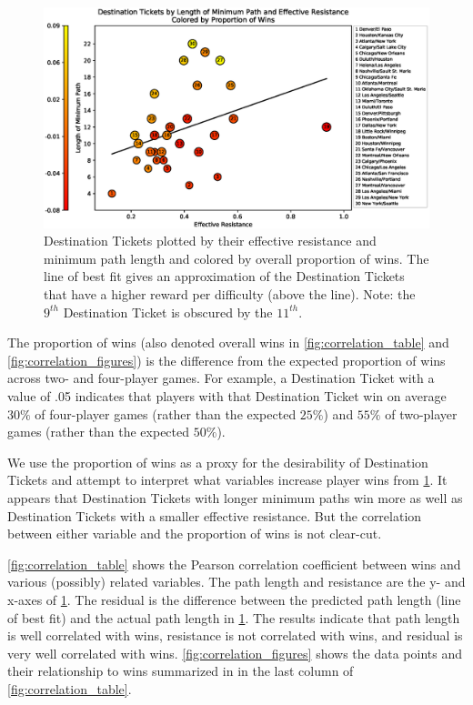 \begin{figure}[h]
    \centering
    \includegraphics[scale=.6]{figures/resistance_aggregate}
    \caption{Destination Tickets plotted by their effective
    resistance and minimum path length and colored
    by overall proportion of wins.
    The line of best fit gives an approximation of the
    Destination Tickets that have a higher reward per difficulty
    (above the line).
    Note: the $9^{th}$ Destination Ticket 
    is obscured by the $11^{th}$.}
    \label{fig:resistance}
\end{figure}

The proportion of wins (also denoted overall wins
in \cref{fig:correlation_table} and \cref{fig:correlation_figures})
is the difference from the expected proportion of wins
across two- and four-player games.
For example, a Destination Ticket with a value of .05 indicates
that players with that Destination Ticket 
win on average $30\%$ of four-player games
(rather than the expected $25\%$) and $55\%$ of 
two-player games (rather than the expected $50\%$).

We use the proportion of wins as a proxy for the desirability
of Destination Tickets and attempt to interpret what variables
increase player wins from \cref{fig:resistance}.
It appears that Destination Tickets with longer minimum paths win
more as well as Destination Tickets with 
a smaller effective resistance.
But the correlation between either variable and the proportion
of wins is not clear-cut.

\cref{fig:correlation_table} shows the Pearson 
correlation coefficient
between wins and various (possibly) related variables.
The path length and resistance are the y- and x-axes of 
\cref{fig:resistance}.
The residual is the difference between the predicted
path length (line of best fit) and the actual path length
in \cref{fig:resistance}.
The results indicate that path length is well correlated with wins,
resistance is not correlated with wins, and residual is very
well correlated with wins.
\cref{fig:correlation_figures} shows the data points and
their relationship to wins summarized in
in the last column of \cref{fig:correlation_table}.

